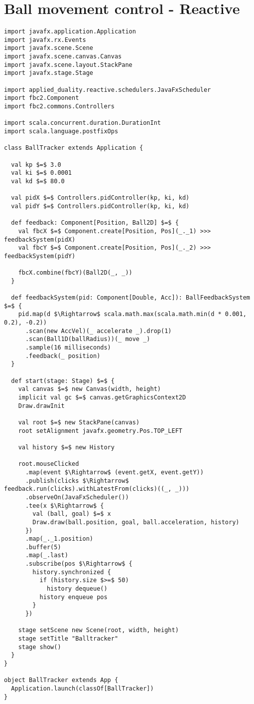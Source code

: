 \chapter{Ball movement control - Reactive}
\label{app:ball-movement-reactive}

\begin{lstlisting}[style=ScalaStyle, caption={Ball movement control}, label={lst:ball-full-app-reactive}]
import javafx.application.Application
import javafx.rx.Events
import javafx.scene.Scene
import javafx.scene.canvas.Canvas
import javafx.scene.layout.StackPane
import javafx.stage.Stage

import applied_duality.reactive.schedulers.JavaFxScheduler
import fbc2.Component
import fbc2.commons.Controllers

import scala.concurrent.duration.DurationInt
import scala.language.postfixOps

class BallTracker extends Application {

  val kp $=$ 3.0
  val ki $=$ 0.0001
  val kd $=$ 80.0

  val pidX $=$ Controllers.pidController(kp, ki, kd)
  val pidY $=$ Controllers.pidController(kp, ki, kd)

  def feedback: Component[Position, Ball2D] $=$ {
    val fbcX $=$ Component.create[Position, Pos](_._1) >>> feedbackSystem(pidX)
    val fbcY $=$ Component.create[Position, Pos](_._2) >>> feedbackSystem(pidY)

    fbcX.combine(fbcY)(Ball2D(_, _))
  }

  def feedbackSystem(pid: Component[Double, Acc]): BallFeedbackSystem $=$ {
    pid.map(d $\Rightarrow$ scala.math.max(scala.math.min(d * 0.001, 0.2), -0.2))
      .scan(new AccVel)(_ accelerate _).drop(1)
      .scan(Ball1D(ballRadius))(_ move _)
      .sample(16 milliseconds)
      .feedback(_ position)
  }

  def start(stage: Stage) $=$ {
    val canvas $=$ new Canvas(width, height)
    implicit val gc $=$ canvas.getGraphicsContext2D
    Draw.drawInit

    val root $=$ new StackPane(canvas)
    root setAlignment javafx.geometry.Pos.TOP_LEFT

    val history $=$ new History

    root.mouseClicked
      .map(event $\Rightarrow$ (event.getX, event.getY))
      .publish(clicks $\Rightarrow$ feedback.run(clicks).withLatestFrom(clicks)((_, _)))
      .observeOn(JavaFxScheduler())
      .tee(x $\Rightarrow$ {
        val (ball, goal) $=$ x
        Draw.draw(ball.position, goal, ball.acceleration, history)
      })
      .map(_._1.position)
      .buffer(5)
      .map(_.last)
      .subscribe(pos $\Rightarrow$ {
        history.synchronized {
          if (history.size $>=$ 50)
            history dequeue()
          history enqueue pos
        }
      })

    stage setScene new Scene(root, width, height)
    stage setTitle "Balltracker"
    stage show()
  }
}

object BallTracker extends App {
  Application.launch(classOf[BallTracker])
}
\end{lstlisting}

